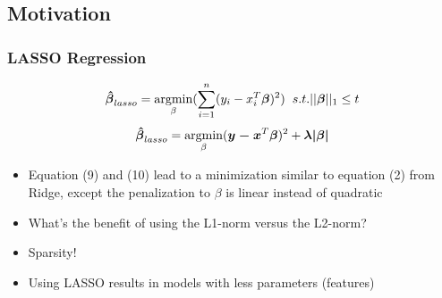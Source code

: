 \documentclass[]{beamer}
\newcommand{\argmin}{\operatornamewithlimits{argmin}}
\begin{document}
\subsection{Motivation}
\begin{frame}
\frametitle{LASSO Regression}   %
\begin{equation}
\boldsymbol{\hat{\beta}}_{lasso} = \argmin_{\beta}( \sum_{i=1}^{n} (y_i-x_{i}^T \boldsymbol{\beta})^2) \hspace{0.2cm} s.t. ||\boldsymbol{\beta}||_1 \le t
\end{equation}
\begin{equation}
\boldsymbol{\hat{\beta}}_{lasso} = \argmin_{\beta} (\boldsymbol{y - x}^{T} \boldsymbol{\beta})^2 + \boldsymbol{\lambda |\beta|}
\end{equation}

\begin{itemize}
\item<1-> Equation (9) and (10) lead to a minimization similar to equation (2) from Ridge, except the penalization to $\beta$ is linear instead of quadratic
\item<2-> What's the benefit of using the L1-norm versus the L2-norm?
\item<3-> Sparsity!
\item<4-> Using LASSO results in models with less parameters (features)
\end{itemize}
\end{frame}
\end{document}
